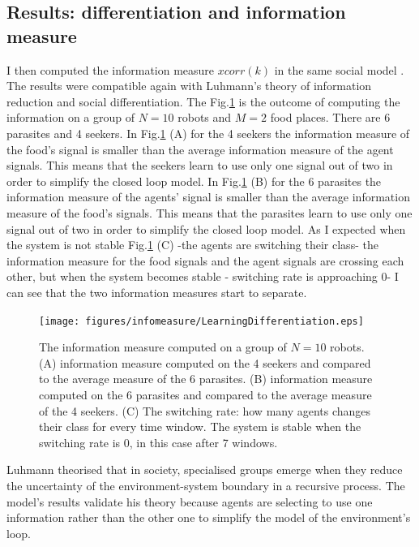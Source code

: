 \subsection{Results: differentiation and information measure}
I then computed the information measure $xcorr(k)$ in the same social model \citep{DiProdiMultiAgent}.
The results were compatible again with Luhmann's theory of information reduction
and social differentiation.
The Fig.\ref{info:social} is the outcome of computing the information on a
group of $N=10$ robots and $M=2$ food places.
There are 6 parasites and 4 seekers. In Fig.\ref{info:social} (A) for the 4 seekers
 the information measure of the food's signal is smaller than the average information
 measure of the agent signals. This means that the seekers learn to use only one
signal out of two in order to simplify the closed loop model.
In Fig.\ref{info:social} (B) for the 6 parasites the information measure of the
 agents' signal is smaller than the average information measure of the food's signals.
This means that the parasites learn to use only one signal out of two in order to
 simplify the closed loop model. As I expected when the system is not stable
 Fig.\ref{info:social} (C)  -the agents are switching their class-
the information measure for the food signals and the agent signals are
crossing each other, but when the system becomes stable - switching rate is
approaching 0- I can see that the two information measures start to separate.

\begin{figure}[htbp]
  \begin{center}
    \texttt{[image: figures/infomeasure/LearningDifferentiation.eps]}
    \caption[Max corr computed on the social system]{The information measure computed
      on a group of $N=10$ robots. (A) information measure computed on the 4 seekers
      and compared to the average measure of the 6 parasites. (B) information measure
      computed on the 6 parasites and compared to the average measure of the 4 seekers.
      (C) The switching rate: how many agents changes their class for every time window.
      The system is stable when the switching rate is 0, in this case after 7 windows.
      \label{info:social}}
  \end{center}
\end{figure}

Luhmann theorised that in society, specialised groups emerge when they reduce
the uncertainty of the environment-system boundary in a recursive process.
The model's results validate his theory because agents are selecting to use one
information rather than the other one to simplify the model of the environment's loop.


